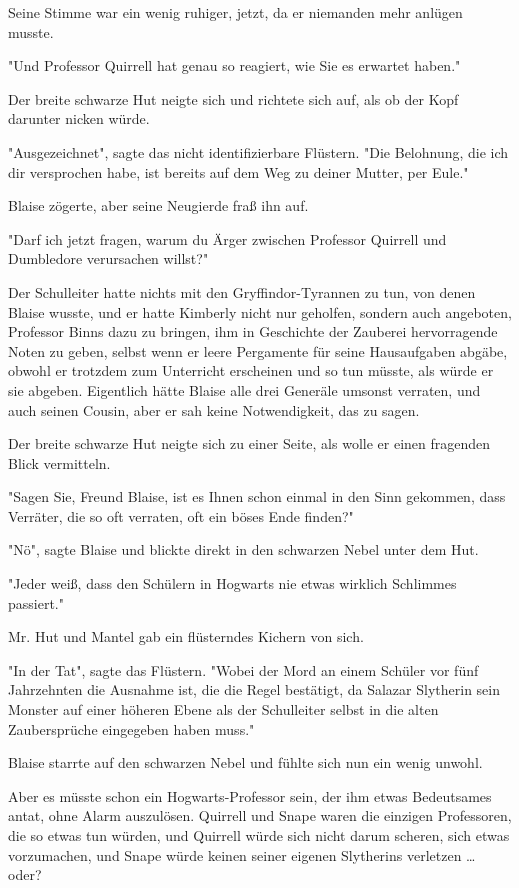 {Seine Stimme war ein wenig ruhiger, jetzt, da er niemanden mehr anlügen musste.

"Und Professor Quirrell hat genau so reagiert, wie Sie es erwartet haben."

Der breite schwarze Hut neigte sich und richtete sich auf, als ob der Kopf darunter nicken würde.

"Ausgezeichnet", sagte das nicht identifizierbare Flüstern. "Die Belohnung, die ich dir versprochen habe, ist bereits auf dem Weg zu deiner Mutter, per Eule."

Blaise zögerte, aber seine Neugierde fraß ihn auf.

"Darf ich jetzt fragen, warum du Ärger zwischen Professor Quirrell und Dumbledore verursachen willst?"

Der Schulleiter hatte nichts mit den Gryffindor-Tyrannen zu tun, von denen Blaise wusste, und er hatte Kimberly nicht nur geholfen, sondern auch angeboten, Professor Binns dazu zu bringen, ihm in Geschichte der Zauberei hervorragende Noten zu geben, selbst wenn er leere Pergamente für seine Hausaufgaben abgäbe, obwohl er trotzdem zum Unterricht erscheinen und so tun müsste, als würde er sie abgeben. Eigentlich hätte Blaise alle drei Generäle umsonst verraten, und auch seinen Cousin, aber er sah keine Notwendigkeit, das zu sagen.

Der breite schwarze Hut neigte sich zu einer Seite, als wolle er einen fragenden Blick vermitteln.

"Sagen Sie, Freund Blaise, ist es Ihnen schon einmal in den Sinn gekommen, dass Verräter, die so oft verraten, oft ein böses Ende finden?"

"Nö", sagte Blaise und blickte direkt in den schwarzen Nebel unter dem Hut.

"Jeder weiß, dass den Schülern in Hogwarts nie etwas wirklich Schlimmes passiert."

Mr. Hut und Mantel gab ein flüsterndes Kichern von sich.

"In der Tat", sagte das Flüstern. "Wobei der Mord an einem Schüler vor fünf Jahrzehnten die Ausnahme ist, die die Regel bestätigt, da Salazar Slytherin sein Monster auf einer höheren Ebene als der Schulleiter selbst in die alten Zaubersprüche eingegeben haben muss."

Blaise starrte auf den schwarzen Nebel und fühlte sich nun ein wenig unwohl.

Aber es müsste schon ein Hogwarts-Professor sein, der ihm etwas Bedeutsames antat, ohne Alarm auszulösen. Quirrell und Snape waren die einzigen Professoren, die so etwas tun würden, und Quirrell würde sich nicht darum scheren, sich etwas vorzumachen, und Snape würde keinen seiner eigenen Slytherins verletzen … oder?

}
